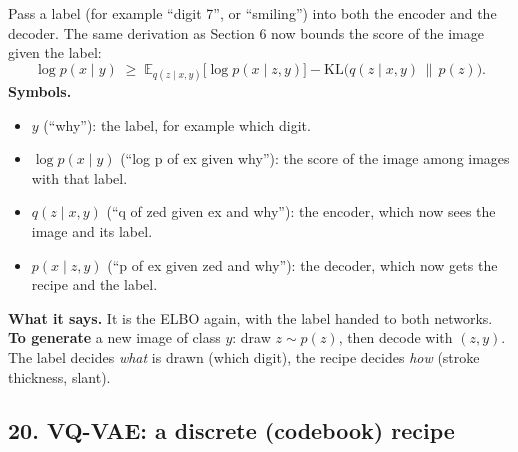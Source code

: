 Pass a label (for example ``digit 7'', or ``smiling'') into both the encoder and the decoder. The same derivation as Section 6 now bounds the score of the image given the label:
\[
\log p(x \mid y) \;\ge\; \mathbb{E}_{q(z \mid x, y)}\big[\log p(x \mid z, y)\big] - \mathrm{KL}\big(q(z \mid x, y)\,\|\,p(z)\big).
\]
\textbf{Symbols.}
\begin{itemize}[leftmargin=1.5em, itemsep=0pt]
\item $y$ (``why''): the label, for example which digit.
\item $\log p(x \mid y)$ (``log p of ex given why''): the score of the image among images with that label.
\item $q(z \mid x, y)$ (``q of zed given ex and why''): the encoder, which now sees the image and its label.
\item $p(x \mid z, y)$ (``p of ex given zed and why''): the decoder, which now gets the recipe and the label.
\end{itemize}
\textbf{What it says.} It is the ELBO again, with the label handed to both networks. \textbf{To generate} a new image of class $y$: draw $z \sim p(z)$, then decode with $(z, y)$. The label decides \emph{what} is drawn (which digit), the recipe decides \emph{how} (stroke thickness, slant).

\subsection*{20. VQ-VAE: a discrete (codebook) recipe}


